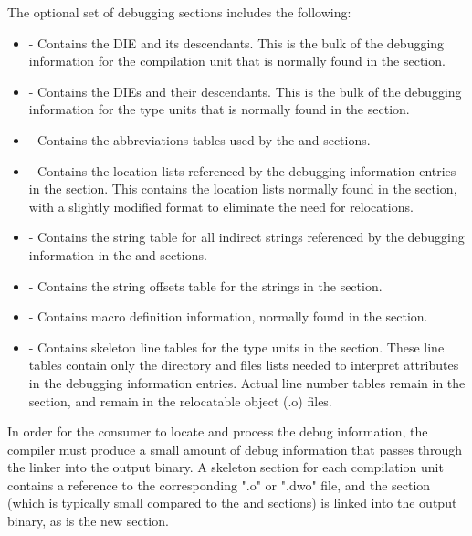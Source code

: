 The optional set of debugging sections includes the following:
\begin{itemize}
\item
\dotdebuginfodwo{} - Contains the \DWTAGcompileunit{} DIE and
its descendants. This is the bulk of the debugging
information for the compilation unit that is normally found
in the \dotdebuginfo{} section.
\item
\dotdebugtypesdwo{} - Contains the \DWTAGtypeunit{} DIEs and
their descendants. This is the bulk of the debugging
information for the type units that is normally found in the
\dotdebugtypes{} section.
\item
\dotdebugabbrevdwo{} - Contains the abbreviations tables used by
the \dotdebuginfodwo{} and \dotdebugtypesdwo{} sections.
\item
\dotdebuglocdwo{} - Contains the location lists referenced by
the debugging information entries in the \dotdebuginfodwo{}
section. This contains the location lists normally found in 
the \dotdebugloc{} section,
with a slightly modified format to eliminate the need for
relocations.
\item
\dotdebugstrdwo{} - Contains the string table for all indirect
strings referenced by the debugging information in the
\dotdebuginfodwo{} and \dotdebugtypesdwo{} sections.
\item
\dotdebugstroffsetsdwo{} - Contains the string offsets table
for the strings in the \dotdebugstrdwo{}{} section.
\item
\dotdebugmacinfodwo{} - Contains macro definition information,
normally found in the \dotdebugmacinfo{} section.
\item
\dotdebuglinedwo{} - Contains skeleton line tables for the type
units in the \dotdebugtypesdwo{} section. These line tables
contain only the directory and files lists needed to
interpret \DWATdeclfile{} attributes in the debugging
information entries. Actual line number tables remain in the
\dotdebugline{} section, and remain in the relocatable object
(.o) files.
\end{itemize}

In order for the consumer to locate and process the debug
information, the compiler must produce a small amount of debug
information that passes through the linker into the output
binary. A skeleton \dotdebuginfo{} section for each compilation unit
contains a reference to the corresponding ".o" or ".dwo"
file, and the \dotdebugline{} section (which is typically small
compared to the \dotdebuginfo{} and \dotdebugtypes{} sections) is
linked into the output binary, as is the new \dotdebugaddr{}
section.


